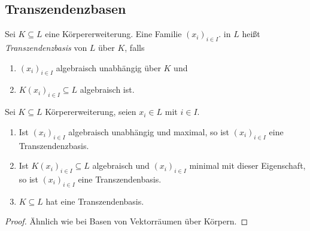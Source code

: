 \documentclass[12pt,a4paper]{scrartcl}
\theoremstyle{cplain}
\theoremstyle{cdef}
\begin{document}
\subsection{Transzendenzbasen}
\begin{defi} Sei $K\subseteq L$ eine Körpererweiterung. Eine Familie $(x_i)_{i\in I}$. in $L$ heißt \emph{Transzendenzbasis} von $L$ über $K$, falls
\begin{enumerate}
	\item $(x_i)_{i\in I}$ algebraisch unabhängig über $K$ und
	\item $K(x_i)_{i\in I}\subseteq L$ algebraisch ist.
\end{enumerate}
\end{defi}
\begin{satz}
	Sei $K\subseteq L$ Körpererweiterung, seien $x_i\in L$ mit $i\in I$.
	\begin{enumerate}
		\item Ist $(x_i)_{i\in I}$ algebraisch unabhängig und maximal, so ist $(x_i)_{i\in I}$ eine Transzendenzbasis.
		\item Ist $K(x_i)_{i\in I}\subseteq L$ algebraisch und $(x_i)_{i\in I}$ minimal mit dieser Eigenschaft, so ist $(x_i)_{i\in I}$ eine Transzendenbasis. 
		\item $K\subseteq L$ hat eine Transzendenbasis.
	\end{enumerate}
\end{satz}
\begin{proof} Ähnlich wie bei Basen von Vektorräumen über Körpern.
\end{proof}
\end{document}
